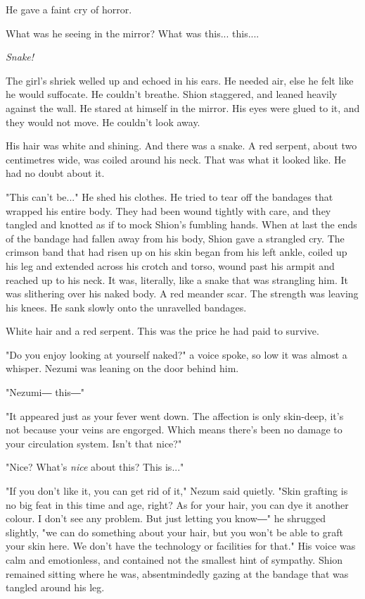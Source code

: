 He gave a faint cry of horror.

What was he seeing in the mirror? What was this... this....

\emph{Snake!}

The girl's shriek welled up and echoed in his ears. He needed air, else
he felt like he would suffocate. He couldn't breathe. Shion staggered,
and leaned heavily against the wall. He stared at himself in the mirror.
His eyes were glued to it, and they would not move. He couldn't look
away.

His hair was white and shining. And there was a snake. A red serpent,
about two centimetres wide, was coiled around his neck. That was what it
looked like. He had no doubt about it.

"This can't be..." He shed his clothes. He tried to tear off the
bandages that wrapped his entire body. They had been wound tightly with
care, and they tangled and knotted as if to mock Shion's fumbling hands.
When at last the ends of the bandage had fallen away from his body,
Shion gave a strangled cry. The crimson band that had risen up on his
skin began from his left ankle, coiled up his leg and extended across
his crotch and torso, wound past his armpit and reached up to his neck.
It was, literally, like a snake that was strangling him. It was
slithering over his naked body. A red meander scar. The strength was
leaving his knees. He sank slowly onto the unravelled bandages.

White hair and a red serpent. This was the price he had paid to survive.

"Do you enjoy looking at yourself naked?" a voice spoke, so low it was
almost a whisper. Nezumi was leaning on the door behind him.

"Nezumi― this―"

"It appeared just as your fever went down. The affection is only
skin-deep, it's not because your veins are engorged. Which means there's
been no damage to your circulation system. Isn't that nice?"

"Nice? What's \emph{nice} about this? This is..."

"If you don't like it, you can get rid of it," Nezum said quietly. "Skin
grafting is no big feat in this time and age, right? As for your hair,
you can dye it another colour. I don't see any problem. But just letting
you know―" he shrugged slightly, "we can do something about your hair,
but you won't be able to graft your skin here. We don't have the
technology or facilities for that." His voice was calm and emotionless,
and contained not the smallest hint of sympathy. Shion remained sitting
where he was, absentmindedly gazing at the bandage that was tangled
around his leg.

